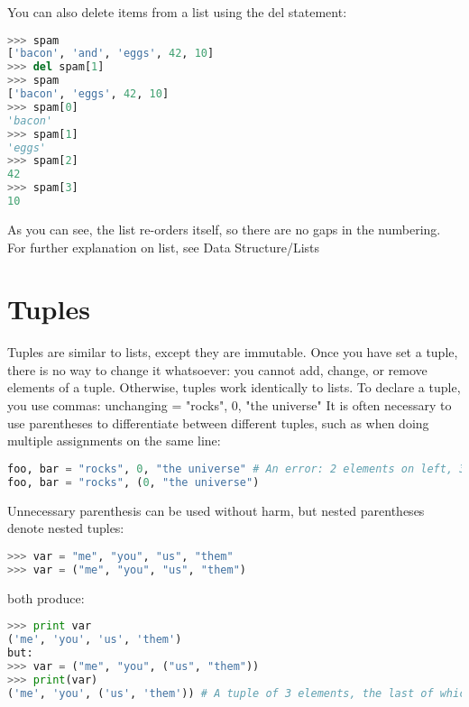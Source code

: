 You can also delete items from a list using the del statement:
\lstset{basicstyle=\scriptsize, numbers=left, captionpos=b, tabsize=4}
\begin{lstlisting}[caption=delete Operation on List,language={Python},
xleftmargin=15pt, label=lst:deleteoperationonlist]
>>> spam
['bacon', 'and', 'eggs', 42, 10]
>>> del spam[1]
>>> spam
['bacon', 'eggs', 42, 10]
>>> spam[0]
'bacon'
>>> spam[1]
'eggs'
>>> spam[2]
42
>>> spam[3]
10
\end{lstlisting}

As you can see, the list re-orders itself, so there are no gaps in the
numbering.  For further explanation on list, see Data Structure/Lists

\section{Tuples}
Tuples are similar to lists, except they are immutable. Once you have set a
tuple, there is no way to change it whatsoever: you cannot add, change, or
remove elements of a tuple. Otherwise, tuples work identically to lists.  To
declare a tuple, you use commas: unchanging = "rocks", 0, "the universe" It is
often necessary to use parentheses to differentiate between different tuples,
such as when doing multiple assignments on the same line:
\lstset{basicstyle=\scriptsize, numbers=left, captionpos=b, tabsize=4}
\begin{lstlisting}[caption=Tuple Definition 1,language={Python},
xleftmargin=15pt, label=lst:tupledefinition1]
foo, bar = "rocks", 0, "the universe" # An error: 2 elements on left, 3 on right
foo, bar = "rocks", (0, "the universe")
\end{lstlisting}

Unnecessary parenthesis can be used without harm, but nested parentheses denote
nested tuples:
\lstset{basicstyle=\scriptsize, numbers=left, captionpos=b, tabsize=4}
\begin{lstlisting}[caption=Tuple Definition 2,language={Python},
xleftmargin=15pt, label=lst:tupledefinitio2]
>>> var = "me", "you", "us", "them"
>>> var = ("me", "you", "us", "them")
\end{lstlisting}
both produce:

\lstset{basicstyle=\scriptsize, numbers=left, captionpos=b, tabsize=4}
\begin{lstlisting}[caption=Tuple Definition 3,language={Python},
xleftmargin=15pt, label=lst:tupledefinition3]
>>> print var 
('me', 'you', 'us', 'them')
but:
>>> var = ("me", "you", ("us", "them"))
>>> print(var)
('me', 'you', ('us', 'them')) # A tuple of 3 elements, the last of which is itself a tuple.
\end{lstlisting}

